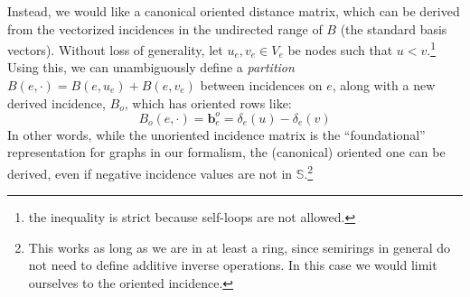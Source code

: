 \documentclass[%
	12pt,
		oneside,
		letterpaper
]{book}
\begin{document}
Instead, we would like a canonical oriented distance matrix, which can
be derived from the vectorized incidences in the undirected range of
\(B\) (the standard basis vectors). Without loss of generality, let
\(u_e,v_e\in V_e\) be nodes such that \(u<v\).\footnote{the inequality
  is strict because self-loops are not allowed.} Using this, we can
unambiguously define a \emph{partition}
\(B(e,\cdot)=B(e,u_e) + B(e,v_e)\) between incidences on \(e\), along
with a new derived incidence, \(B_o\), which has oriented rows like:
\[B_o(e,\cdot)=\mathbf{b}^o_e = \delta_e(u)-\delta_e(v)\] In other
words, while the unoriented incidence matrix is the ``foundational''
representation for graphs in our formalism, the (canonical) oriented one
can be derived, even if negative incidence values are not in
\(\mathbb{S}\).\footnote{ This works as long as we are in at least a
  ring, since semirings in general do not need to define additive
  inverse operations. In this case we would limit ourselves to the
  oriented incidence.}
\end{document}
